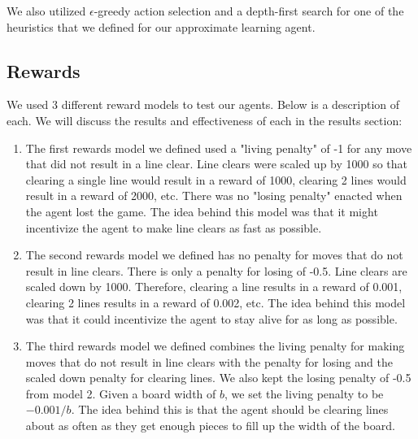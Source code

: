 \documentclass[10pt]{article}
\begin{document}
We also utilized $\epsilon$-greedy action selection and a depth-first search for one of the heuristics that we defined for our approximate learning agent.

\subsection{Rewards}
We used 3 different reward models to test our agents. Below is a description of each. We will discuss the results and effectiveness of each in the results section:
\begin{enumerate}
    \item The first rewards model we defined used a "living penalty" of -1 for any move that did not result in a line clear. Line clears were scaled up by 1000 so that clearing a single line would result in a reward of 1000, clearing 2 lines would result in a reward of 2000, etc. There was no "losing penalty" enacted when the agent lost the game. The idea behind this model was that it might incentivize the agent to make line clears as fast as possible.
    \item The second rewards model we defined has no penalty for moves that do not result in line clears. There is only a penalty for losing of -0.5. Line clears are scaled down by 1000. Therefore, clearing a line results in a reward of 0.001, clearing 2 lines results in a reward of 0.002, etc. The idea behind this model was that it could incentivize the agent to stay alive for as long as possible.
    \item The third rewards model we defined combines the living penalty for making moves that do not result in line clears with the penalty for losing and the scaled down penalty for clearing lines. We also kept the losing penalty of -0.5 from model 2. Given a board width of $b$, we set the living penalty to be $-0.001/b$. The idea behind this is that the agent should be clearing lines about as often as they get enough pieces to fill up the width of the board.
\end{enumerate}
\end{document}

